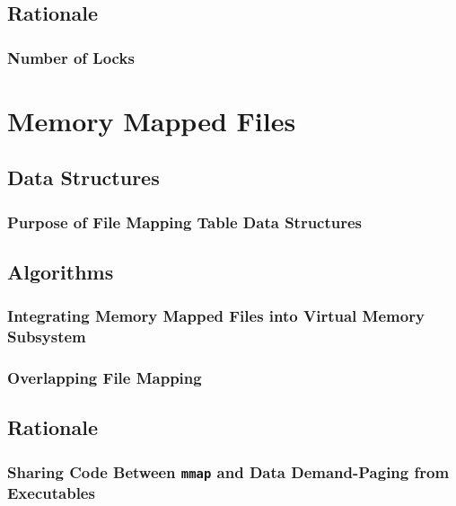 \documentclass{article}
\renewcommand{\_}{\char`_}
\begin{document}
\subsection{Rationale}

\subsubsection{Number of Locks}

\section{Memory Mapped Files}

\subsection{Data Structures}

\subsubsection{Purpose of File Mapping Table Data Structures}

\subsection{Algorithms}

\subsubsection{Integrating Memory Mapped Files into Virtual Memory Subsystem}

\subsubsection{Overlapping File Mapping}

\subsection{Rationale}

\subsubsection{Sharing Code Between \texttt{mmap} and Data Demand-Paging from Executables}
\end{document}
